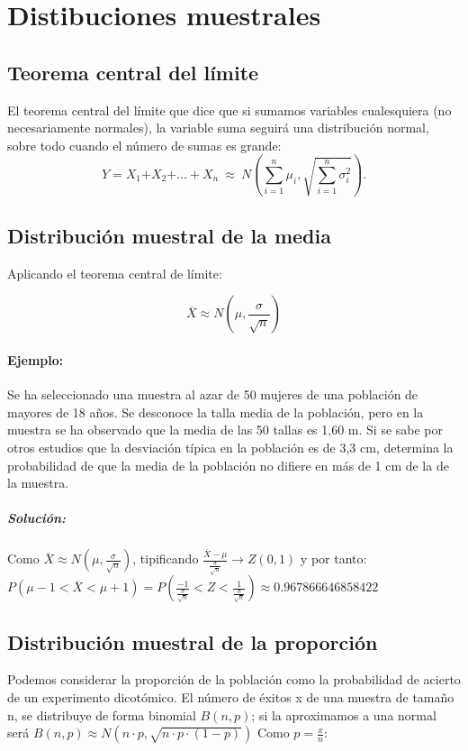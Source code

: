 \section{Distibuciones muestrales}

\subsection{Teorema central del límite}

El teorema central del límite que dice que si sumamos variables cualesquiera (no necesariamente normales), la variable suma seguirá una distribución normal, sobre todo cuando el número de sumas es grande:
$$Y\mathrm{=}X_{\mathrm{1}}\mathrm{+}X_{\mathrm{2}}\mathrm{+...+}X_n\ \mathrm{\approx }\ N\left(\sum^n_{i\mathrm{=1}}{}{\mu }_i,\sqrt{\sum^n_{i\mathrm{=1}}{}{\sigma }^{\mathrm{2}}_i}\right).$$

\subsection{Distribución muestral de la media }
Aplicando el teorema central de límite:

$$\overline{X} \approx N\left(\mu,\frac{\sigma}{\sqrt{n}}\right)$$

\paragraph{Ejemplo:}
 Se ha seleccionado una muestra al azar de 50 mujeres de una población de mayores
de 18 años. Se desconoce la talla media de la población, pero en la muestra se ha
observado que la media de las 50 tallas es 1,60 m. Si se sabe por otros estudios que
la desviación típica en la población es de 3,3 cm, determina la probabilidad de que la
media de la población no difiere en más de 1 cm de la de la muestra. 

\subparagraph{Solución:} Como $\overline{X} \approx N\left(\mu,\frac{\sigma}{\sqrt{n}}\right)$, tipificando $\frac{\overline{X} -\mu}{\frac{\sigma}{\sqrt{n}}} \rightarrow Z(0,1)$ y por tanto: $P(\mu-1 < \overline{X} < \mu +1)=P(\frac{-1}{\frac{\sigma}{\sqrt{n}}} < Z < \frac{1}{\frac{\sigma}{\sqrt{n}}})\approx 0.967866646858422$


\subsection{Distribución muestral de la proporción}

Podemos considerar la proporción de la población como la probabilidad de acierto de un experimento dicotómico.
El número de éxitos x de una muestra de tamaño n, se distribuye de forma binomial $B(n, p)$; si la aproximamos a una normal será $B(n, p) \approx N( n\cdot p, \sqrt{n\cdot p \cdot (1-p)})$  Como $p = \frac{x}{n}$:

